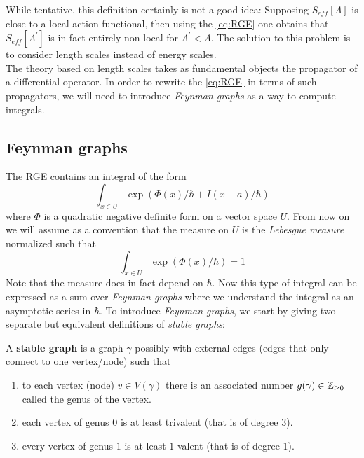 While tentative, this definition certainly is not a good idea: Supposing $S_{eff}[\Lambda]$ is close to a local action functional, then using the \ref{eq:RGE} one obtains that $S_{eff}[\Lambda^\prime]$ is in fact entirely non local for $\Lambda^\prime < \Lambda$. The solution to this problem is to consider length scales instead of energy scales.\\

The theory based on length scales takes as fundamental objects the propagator of a differential operator. In order to rewrite the \ref{eq:RGE} in terms of such propagators, we will need to introduce \emph{Feynman graphs} as a way to compute integrals.

\subsection{Feynman graphs}
\label{subsec:feynmann_graphs}

The RGE contains an integral of the form
\begin{equation} \int_{x \in U} \exp(\Phi(x)/\hbar + I(x+a)/\hbar)\end{equation}
where $\Phi$ is a quadratic negative definite form on a vector space $U$. From now on we will assume as a convention that the measure on $U$ is the \emph{Lebesgue measure} normalized such that
\begin{equation} \int_{x \in U} \exp(\Phi(x)/\hbar) = 1\end{equation}
Note that the measure does in fact depend on $\hbar$. Now this type of integral can be expressed as a sum over \emph{Feynman graphs} where we understand the integral as an asymptotic series in $\hbar$. To introduce \emph{Feynman graphs}, we start by giving two separate but equivalent definitions of \emph{stable graphs}:

\begin{definition}
  A \textbf{stable graph} is a graph $\gamma$ possibly with external edges (edges that only connect to one vertex/node) such that
  \begin{enumerate}
    \item to each vertex (node) $v \in V(\gamma)$ there is an associated number $g(\gamma) \in \mathbb{Z}_{\geq 0}$ called the genus of the vertex.

    \item each vertex of genus $0$ is at least trivalent (that is of degree 3).

    \item every vertex of genus $1$ is at least $1$-valent (that is of degree 1).
  \end{enumerate}
\end{definition}

